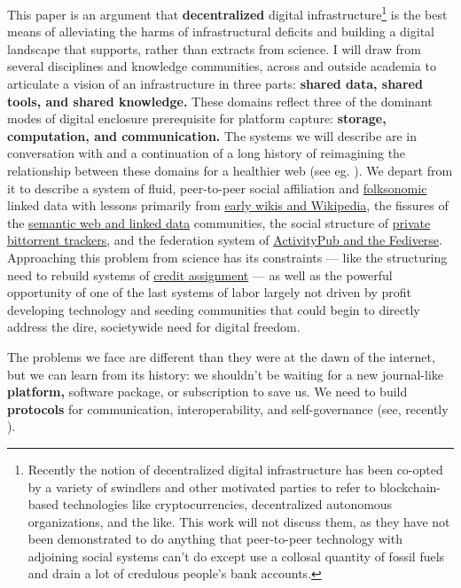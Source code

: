 This paper is an argument that \textbf{decentralized} digital
infrastructure\footnote{Recently the notion of decentralized digital
  infrastructure has been co-opted by a variety of swindlers and other
  motivated parties to refer to blockchain-based technologies like
  cryptocurrencies, decentralized autonomous organizations, and the
  like. This work will not discuss them, as they have not been
  demonstrated to do anything that peer-to-peer technology with
  adjoining social systems can't do except use a collosal quantity of
  fossil fuels and drain a lot of credulous people's bank accounts.} is
the best means of alleviating the harms of infrastructural deficits and
building a digital landscape that supports, rather than extracts from
science. I will draw from several disciplines and knowledge communities,
across and outside academia to articulate a vision of an infrastructure
in three parts: \textbf{shared data, shared tools, and shared
knowledge.} These domains reflect three of the dominant modes of digital
enclosure prerequisite for platform capture: \textbf{storage,
computation, and communication.} The systems we will describe are in
conversation with and a continuation of a long history of reimagining
the relationship between these domains for a healthier web (see eg. \citep{berners-leeSociallyAwareCloud2009, berners-leeWebServicesOverview2009} ). We depart from it to describe
a system of fluid, peer-to-peer social affiliation and
\protect\hyperlink{federated-systems-of-language}{folksonomic} linked
data with lessons primarily from \protect\hyperlink{the-wiki-way}{early
wikis and Wikipedia}, the fissures of the
\protect\hyperlink{neatness-vs-scruffiness}{semantic web and linked
data} communities, the social structure of
\protect\hyperlink{archives-need-communities}{private bittorrent
trackers}, and the federation system of
\protect\hyperlink{forums--feeds}{ActivityPub and the Fediverse}.
Approaching this problem from science has its constraints --- like the
structuring need to rebuild systems of
\protect\hyperlink{credit-assignment}{credit assignment} --- as well as
the powerful opportunity of one of the last systems of labor largely not
driven by profit developing technology and seeding communities that
could begin to directly address the dire, societywide need for digital
freedom.

The problems we face are different than they were at the dawn of the
internet, but we can learn from its history: we shouldn't be waiting for
a new journal-like \textbf{platform,} software package, or subscription
to save us. We need to build \textbf{protocols} for communication,
interoperability, and self-governance (see, recently \citep{brembsReplacingAcademicJournals2021} ).

